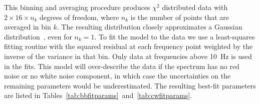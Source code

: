 This binning and averaging procedure produces $\chi^2$ distributed data with $2 \times 16 \times n_k$ degrees of freedom, where $n_k$ is the number of points that are averaged in bin $k$.
The resulting distribution closely approximates a Gaussian distribution~\autocite{Norrelykke2010RSI}, even for $n_k = 1$.
To fit the model to the data we use a least-squares fitting routine with the squared residual at each frequency point weighted by the inverse of the variance in that bin.
Only data at frequencies above \SI{10}{Hz} is used in the fits.
This model will over-describe the data if the spectrum has no red noise or no white noise component, in which case the uncertainties on the remaining parameters would be underestimated.
The resulting best-fit parameters are listed in Tables~\ref{tab:bbfitparams}~and~\ref{tab:cwfitparams}.
